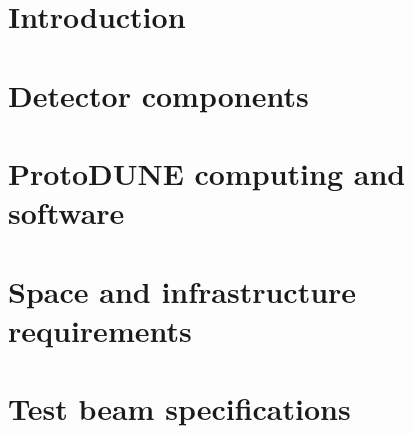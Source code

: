 \ifdefined\isfinal\documentclass[final]{pd-tdr}\else\documentclass{pd-tdr}\fi
\begin{document}






\chapter{Introduction}


%

%

\chapter{Detector components} %


\chapter{ProtoDUNE computing and software}


\chapter{Space and infrastructure requirements}


\chapter{Test beam specifications} 


%

%


\cleardoublepage


\end{document}
